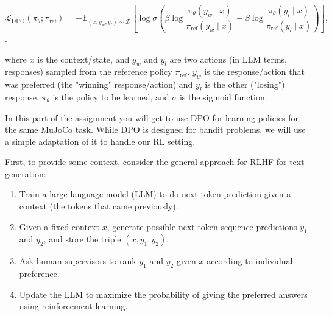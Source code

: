 \documentclass{article}
\begin{document}
$$\mathcal{L}_{\mathrm{DPO}}\left(\pi_\theta ; \pi_{\mathrm{ref}}\right)=-\mathbb{E}_{\left(x, y_w, y_l\right) \sim \mathcal{D}}\left[\log \sigma\left(\beta \log \frac{\pi_\theta\left(y_w \mid x\right)}{\pi_{\mathrm{ref}}\left(y_w \mid x\right)}-\beta \log \frac{\pi_\theta\left(y_l \mid x\right)}{\pi_{\mathrm{ref}}\left(y_l \mid x\right)}\right)\right],$$. 

where $x$ is the context/state, and $y_w$ and $y_l$ are two actions (in LLM terms, responses) sampled from the reference policy $\pi_{\mathrm{ref}}$. $y_w$ is the response/action that was preferred (the "winning" response/action) and $y_l$ is the other ("losing") response. 
$\pi_\theta$ is the policy to be learned, and $\sigma$ is the sigmoid function.

In this part of the assignment you will get to use DPO for learning policies for the same MuJoCo task. While DPO is designed for bandit problems, we will use a simple adaptation of it to handle our RL setting. 

First, to provide some context, consider the general approach for RLHF for text generation:

\begin{enumerate}
    \item Train a large language model (LLM) to do next token prediction given a context (the tokens that came previously).
    \item Given a fixed context $x$, generate possible next token sequence predictions $y_1$ and $y_2$, and store the triple $(x, y_1, y_2)$.
    \item Ask human supervisors to rank $y_1$ and $y_2$ given $x$ according to individual preference.
    \item Update the LLM to maximize the probability of giving the preferred answers using reinforcement learning.
\end{enumerate}
\end{document}

